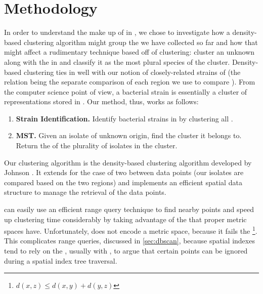 \section{Methodology}\label{sec:methodology:clustering}

In order to understand the make up of \bslongs{} in \cplop{}, we chose to investigate how a density-based clustering algorithm might group the \isols{} we have collected so far and how that might affect a rudimentary \mst{} technique based off of clustering: cluster an unknown \isol{} along with the \isols{} in \cplop{} and classify it as the most plural species of the cluster.
Density-based clustering ties in well with our notion of closely-related strains of \ecoli{} (the relation being the separate \pearson{} comparison of each \itsshort{} region we use to compare \isols{}).
From the computer science point of view, a bacterial strain is essentially a cluster of \ecoli{} \isol{} representations stored in \cplop{}.
Our \mst{} method, thus, works as follows:
\begin{enumerate}
    \item \textbf{Strain Identification.} Identify bacterial strains in \cplop{} by clustering
    all \cplop{} \isols{}.
    \item \textbf{MST.} Given an isolate of unknown origin, find the cluster it belongs to.
    Return the \spec{} of the plurality of isolates in the cluster.
\end{enumerate}

Our clustering algorithm is the density-based clustering algorithm developed by Johnson \cite{johnson2015density}.
It extends \dbscan{} for the case of two \compfuncs{} between data points (our isolates are compared based on the two \itsshort{} regions) and implements an efficient spatial data structure to manage the retrieval of the data points.

\dbscan{} can easily use an efficient range query technique to find nearby points and speed up clustering time considerably by taking advantage of the \trieq{} that proper metric spaces have.
Unfortunately, \pearson{} does not encode a metric space, because it fails the \trieq{}\footnote{$d(x,z)\leq d(x,y) + d(y,z)$}. 
This complicates range queries, discussed in \autoref{sec:dbscan}, because spatial indexes tend to rely on the \trieq{}, usually with \euclid{}, to argue that certain points can be ignored during a spatial index tree traversal. 

